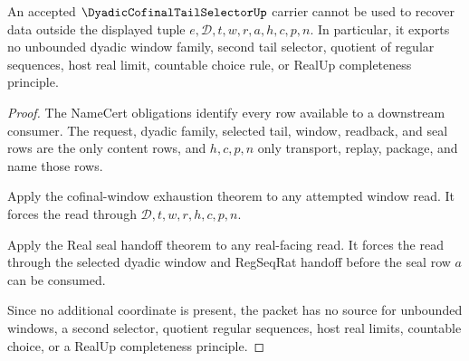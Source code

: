 \begin{theorem}
\label{thm:dyadic-cofinal-tail-selector-nonescape}
An accepted $\DyadicCofinalTailSelectorUp$ carrier cannot be used to recover data outside the displayed tuple $e,\mathcal{D},t,w,r,a,h,c,p,n$. In particular, it exports no unbounded dyadic window family, second tail selector, quotient of regular sequences, host real limit, countable choice rule, or RealUp completeness principle.
\end{theorem}
\begin{proof}
The NameCert obligations identify every row available to a downstream consumer. The request, dyadic family, selected tail, window, readback, and seal rows are the only content rows, and $h,c,p,n$ only transport, replay, package, and name those rows.

Apply the cofinal-window exhaustion theorem to any attempted window read. It forces the read through $\mathcal{D},t,w,r,h,c,p,n$.

Apply the Real seal handoff theorem to any real-facing read. It forces the read through the selected dyadic window and RegSeqRat handoff before the seal row $a$ can be consumed.

Since no additional coordinate is present, the packet has no source for unbounded windows, a second selector, quotient regular sequences, host real limits, countable choice, or a RealUp completeness principle.
\end{proof}


\begin{closurestatus}{\DyadicCofinalTailSelectorUp}
  \theoryclosure{\seedClosure}
  \formalstatus{\unformalizedV}
\end{closurestatus}
